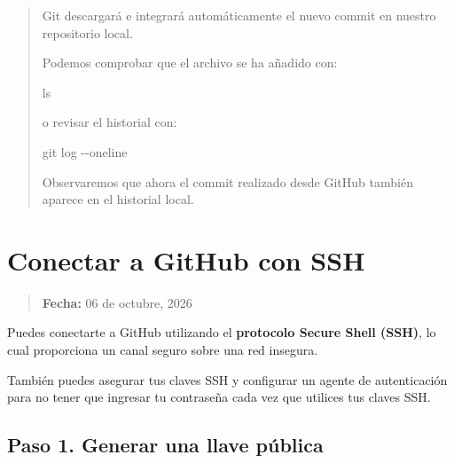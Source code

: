 \documentclass[
  spanish,
  12pt,
  letterpaper,
  DIV=11,
  numbers=noendperiod]{scrreprt}
\newenvironment{Shaded}{\begin{snugshade}}{\end{snugshade}}
\newcommand{\AttributeTok}[1]{\textcolor[rgb]{0.40,0.45,0.13}{#1}}
\newcommand{\FunctionTok}[1]{\textcolor[rgb]{0.28,0.35,0.67}{#1}}
\newcommand{\NormalTok}[1]{\textcolor[rgb]{0.00,0.23,0.31}{#1}}
\begin{document}
\begin{tcolorbox}
\begin{quote}
Git descargará e integrará automáticamente el nuevo commit en nuestro
repositorio local.

Podemos comprobar que el archivo se ha añadido con:

\begin{Shaded}
\begin{Highlighting}[]
\FunctionTok{ls}
\end{Highlighting}
\end{Shaded}

o revisar el historial con:

\begin{Shaded}
\begin{Highlighting}[]
\FunctionTok{git}\NormalTok{ log }\AttributeTok{{-}{-}oneline}
\end{Highlighting}
\end{Shaded}

Observaremos que ahora el commit realizado desde GitHub también aparece
en el historial local.
\end{quote}

\end{tcolorbox}

\chapter{Conectar a GitHub con SSH}\label{conectar-a-github-con-ssh}

\begin{quote}
\textbf{Fecha:} 06 de octubre, 2026
\end{quote}

Puedes conectarte a GitHub utilizando el \textbf{protocolo Secure Shell
(SSH)}, lo cual proporciona un canal seguro sobre una red insegura.

También puedes asegurar tus claves SSH y configurar un agente de
autenticación para no tener que ingresar tu contraseña cada vez que
utilices tus claves SSH.

\section{Paso 1. Generar una llave
pública}\label{paso-1.-generar-una-llave-puxfablica}
\end{document}
